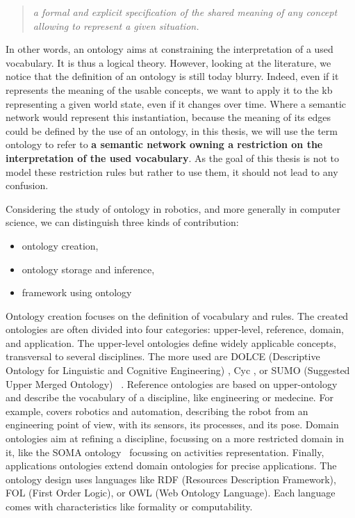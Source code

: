 \begin{quote} 
\centering 
\textit{a formal and explicit specification of the shared meaning of any concept allowing to represent a given situation.}
\end{quote}

In other words, an ontology aims at constraining the interpretation of a used vocabulary. It is thus a logical theory. However, looking at the literature, we notice that the definition of an ontology is still today blurry. Indeed, even if it represents the meaning of the usable concepts, we want to apply it to the \acrshort{kb} representing a given world state, even if it changes over time. Where a semantic network would represent this instantiation, because the meaning of its edges could be defined by the use of an ontology, in this thesis, we will use the term ontology to refer to \textbf{a semantic network owning a restriction on the interpretation of the used vocabulary}. As the goal of this thesis is not to model these restriction rules but rather to use them, it should not lead to any confusion.

Considering the study of ontology in robotics, and more generally in computer science, we can distinguish three kinds of contribution:

\begin{itemize}
  \item ontology creation,
  \item ontology storage and inference,
  \item framework using ontology
\end{itemize}

Ontology creation focuses on the definition of vocabulary and rules. The created ontologies are often divided into four categories: upper-level, reference, domain, and application. The upper-level ontologies define widely applicable concepts, transversal to several disciplines. The more used are DOLCE (Descriptive Ontology for Linguistic and Cognitive Engineering) \cite{masolo_2003_dolce}, Cyc \cite{lenat_1989_building}, or SUMO (Suggested Upper Merged Ontology) ~\cite{niles_2001_towards}. Reference ontologies are based on upper-ontology and describe the vocabulary of a discipline, like engineering or medecine. For example, \cite{schlenoff_2015_ieee} covers robotics and automation, describing the robot from an engineering point of view, with its sensors, its processes, and its pose. Domain ontologies aim at refining a discipline, focussing on a more restricted domain in it, like the SOMA ontology~\cite{bessler_2020_foundations} focussing on activities representation. Finally, applications ontologies extend domain ontologies for precise applications. The ontology design uses languages like RDF (Resources Description Framework), FOL (First Order Logic), or OWL (Web Ontology Language). Each language comes with characteristics like formality or computability.

